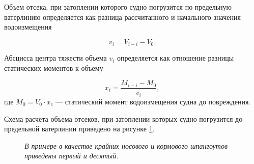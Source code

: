 Объем отсека, при затоплении которого судно погрузится по предельную ватерлинию определяется как разница рассчитанного и начального значения водоизмещения

\begin{equation}
    v_i = V_{i-i} - V_0.
\end{equation}

Абсцисса центра тяжести объема $v_i$ определяется как отношение разницы статических моментов к объему

\begin{equation}
    x_i = \frac{M_{i-i} - M_0}{v_i},
\end{equation}
где $M_0 = V_0 \cdot x_c$ --- статический момент водоизмещения судна до повреждения.

Схема расчета объема отсеков, при затоплении которых судно погрузится до предельной ватерлинии приведено на рисунке \ref{fig:full-volume}.

\begin{figure}
    \centering
    \footnotesize
    \caption{Схема расчета водоизмещения и статического момента при посадке по предельную ватерлинию в табличном редакторе}
    \caption*{\textit{В примере в качестве крайних носового и кормового шпангоутов приведены первый и десятый.}}
    \label{fig:full-volume}
\end{figure}

